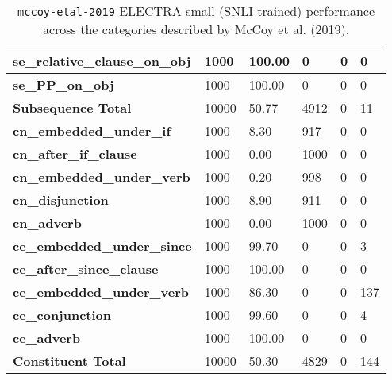 \begin{table}[!ht]
\begin{tabular}{|p{}|p{}|p{}|p{}|p{}|p{}|}
        \textbf{se\_relative\_clause\_on\_obj} & 1000 & 100.00 & 0 & 0 & 0 \\ \hline
        \textbf{se\_PP\_on\_obj} & 1000 & 100.00 & 0 & 0 & 0 \\ \hline
        \textbf{Subsequence Total} & 10000 & 50.77 & 4912 & 0 & 11 \\ \hline
        \textbf{cn\_embedded\_under\_if} & 1000 & 8.30 & 917 & 0 & 0 \\ \hline
        \textbf{cn\_after\_if\_clause} & 1000 & 0.00 & 1000 & 0 & 0 \\ \hline
        \textbf{cn\_embedded\_under\_verb} & 1000 & 0.20 & 998 & 0 & 0 \\ \hline
        \textbf{cn\_disjunction} & 1000 & 8.90 & 911 & 0 & 0 \\ \hline
        \textbf{cn\_adverb} & 1000 & 0.00 & 1000 & 0 & 0 \\ \hline
        \textbf{ce\_embedded\_under\_since} & 1000 & 99.70 & 0 & 0 & 3 \\ \hline
        \textbf{ce\_after\_since\_clause} & 1000 & 100.00 & 0 & 0 & 0 \\ \hline
        \textbf{ce\_embedded\_under\_verb} & 1000 & 86.30 & 0 & 0 & 137 \\ \hline
        \textbf{ce\_conjunction} & 1000 & 99.60 & 0 & 0 & 4 \\ \hline
        \textbf{ce\_adverb} & 1000 & 100.00 & 0 & 0 & 0 \\ \hline
        \textbf{Constituent Total} & 10000 & 50.30 & 4829 & 0 & 144 \\ \hline
    \end{tabular}
    \caption{\texttt{mccoy-etal-2019} ELECTRA-small (SNLI-trained) performance across the categories described by McCoy et al. (2019).}
\end{table}

